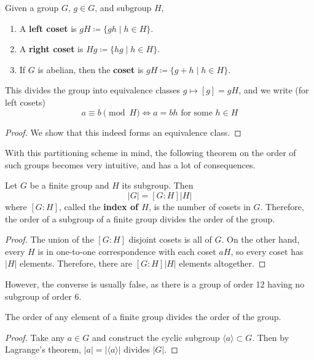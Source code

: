   \begin{definition}[Coset]
    Given a group $G$, $g \in G$, and subgroup $H$, 
    \begin{enumerate}
      \item A \textbf{left coset} is $g H \coloneqq \{g h \mid h \in H \}$. 
      \item A \textbf{right coset} is $H g \coloneqq \{h g \mid h \in H \}$. 
      \item If $G$ is abelian, then the \textbf{coset} is $gH \coloneqq \{g + h \mid h \in H\}$. 
    \end{enumerate}
    This divides the group into equivalence classes $g \mapsto [g] = gH$, and we write (for left cosets)
    \begin{equation}
      a \equiv b \pmod{H} \iff a = b h \text{ for some } h \in H
    \end{equation}
  \end{definition}
  \begin{proof}
    We show that this indeed forms an equivalence class. 
  \end{proof}

  With this partitioning scheme in mind, the following theorem on the order of such groups becomes very intuitive, and has a lot of consequences. 

  \begin{theorem}
    Let $G$ be a finite group and $H$ its subgroup. Then 
    \begin{equation}
      |G| = [G:H] |H|
    \end{equation}
    where $[G:H]$, called the \textbf{index of $H$}, is the number of cosets in $G$. Therefore, the order of a subgroup of a finite group divides the order of the group. 
  \end{theorem}
  \begin{proof}
    The union of the $[G:H]$ disjoint cosets is all of $G$. On the other hand, every $H$ is in one-to-one correspondence with each coset $aH$, so every coset has $|H|$ elements. Therefore, there are $[G:H] |H|$ elements altogether. 
  \end{proof}

  However, the converse is usually false, as there is a group of order 12 having no subgroup of order 6. 

  \begin{corollary}
    The order of any element of a finite group divides the order of the group. 
  \end{corollary}
  \begin{proof}
    Take any $a \in G$ and construct the cyclic subgroup $\langle a \rangle \subset G$. Then by Lagrange's theorem, $|a| = |\langle a \rangle|$ divides $|G|$. 
  \end{proof}

